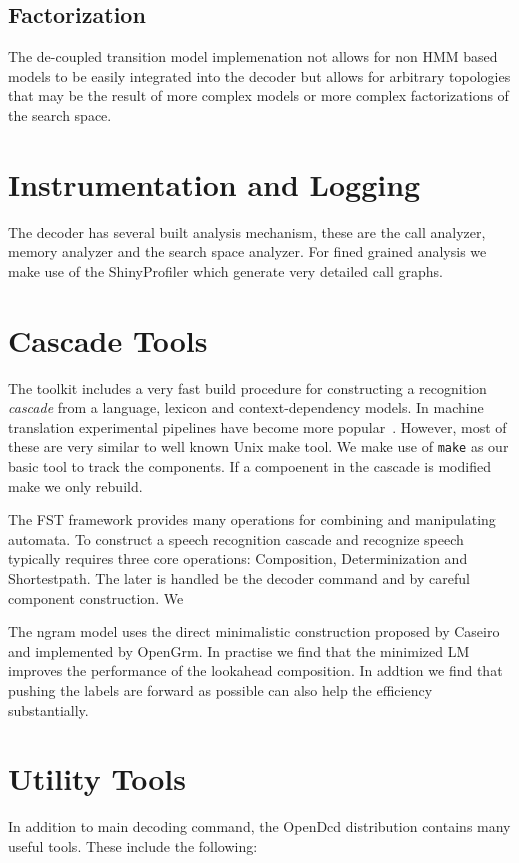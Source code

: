 \documentclass{article}
\begin{document}
\begin{itemize}
\subsection{Factorization}
The de-coupled transition model implemenation not allows for non HMM based models to be easily
integrated into the decoder but allows for arbitrary topologies that may be the result of more
complex models or more complex factorizations of the search space.


\section{Instrumentation and Logging}
\label{sec:instrumentation}
The decoder has several built analysis mechanism, these are the call analyzer,
memory analyzer and the search space analyzer. For fined grained analysis we 
make use of the ShinyProfiler which generate very detailed call graphs.

\section{Cascade Tools}
\label{sec:cascade}
The toolkit includes a very fast build procedure for constructing a recognition
\emph{cascade} from a language, lexicon and context-dependency models. In 
machine translation experimental pipelines have become more popular~\cite{koehn10}. 
However, most of these are very similar to well known Unix make tool. We make 
use of \texttt{make} as our basic tool to track the components. 
If a compoenent in the cascade is modified make we only rebuild.

The FST framework provides many operations for combining and manipulating
automata. To construct a speech recognition cascade and recognize speech 
typically requires three core operations: Composition, Determinization and
Shortestpath. The later is handled be the decoder command and by careful
component construction. We 

The ngram model uses the direct minimalistic construction proposed by
Caseiro~\cite{caseiro01} and implemented by OpenGrm. In practise we 
find that the minimized LM improves the performance of the lookahead composition.
In addtion we find that pushing the labels are forward as possible can also help
the efficiency substantially.

\section{Utility Tools}
\label{sec:postprocess}
In addition to main decoding command, the OpenDcd distribution contains
many useful tools. These include the following:



\end{itemize}
\end{document}
